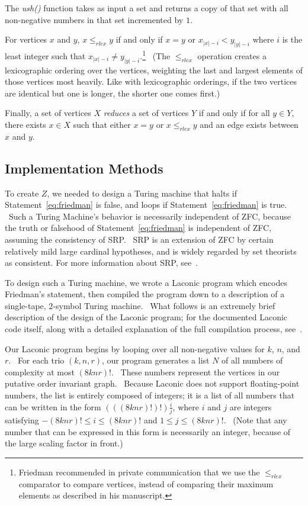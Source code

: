 \documentclass[11pt]{article}
\begin{document}
The \emph{ush()} function takes as input a set and returns a copy of that set with all non-negative numbers in that set incremented by $1$.

For vertices $x$ and $y$, $x \le_{rlex} y$ if and only if $x = y$ or $x_{|x|-i} < y_{|y|-i}$ where $i$ is the least integer such that $x_{|x|-i} \not= y_{|y|-i}$.\footnote{Friedman recommended in private communication that we use the $\le_{rlex}$ comparator to compare vertices, instead of comparing their maximum elements as described in his manuscript.} \ (The $\le_{rlex}$ operation creates a lexicographic ordering over the vertices, weighting the last and largest elements of those vertices most heavily. Like with lexicographic orderings, if the two vertices are identical but one is longer, the shorter one comes first.)

Finally, a set of vertices $X$ \emph{reduces} a set of vertices $Y$ if and only if for all $y \in Y$, there exists $x \in X$ such that
either $x = y$ or $x \le_{rlex} y$ and an edge exists between $x$ and $y$.

\subsection{Implementation Methods}

To create $Z$, we needed to design a Turing machine that halts if Statement~\ref{eq:friedman} is false, and loops if Statement~\ref{eq:friedman} is true. \ Such a Turing Machine's behavior is necessarily independent of ZFC, because the truth or falsehood of Statement~\ref{eq:friedman} is independent of ZFC, assuming the consistency of SRP.~\cite{friedman} SRP is an extension of ZFC by certain relatively mild large cardinal hypotheses, and is widely regarded by set theorists as consistent. For more information about SRP, see~\cite{srp}.

To design such a Turing machine, we wrote a Laconic program which encodes Friedman's statement, then compiled the program down to a description of a single-tape, $2$-symbol Turing machine. \ What follows is an extremely brief description of the design of the Laconic program; for the documented Laconic code itself, along with a detailed explanation of the full compilation process, see~\cite{github}.

Our Laconic program begins by looping over all non-negative values for $k$, $n$, and $r$. \ For each trio $(k, n, r)$, our program generates a list $N$ of all numbers of complexity at most $(8knr)!$. \ These numbers represent the vertices in our putative order invariant graph. \ Because Laconic does not support floating-point numbers, the list is entirely composed of integers; it is a list of all numbers that can be written in the form $(((8knr)!)!)\frac{i}{j}$, where $i$ and $j$ are integers satisfying $-(8knr)! \le i \le (8knr)!$ and $1 \le j \le (8knr)!$. \ (Note that any number that can be expressed in this form is necessarily an integer, because of the large scaling factor in front.)
\end{document}
